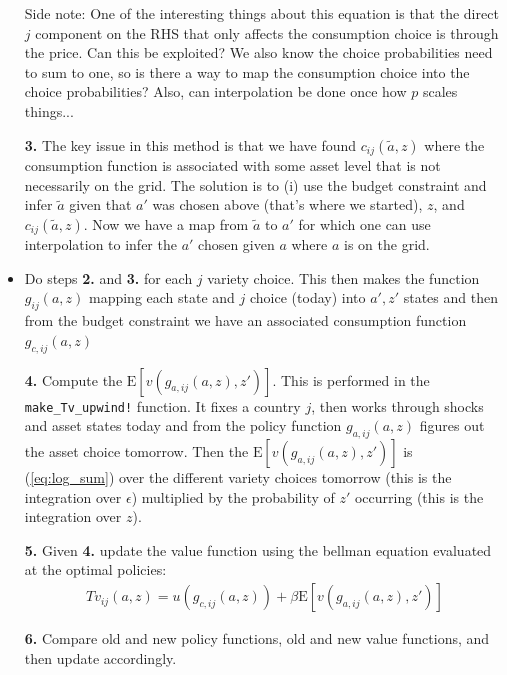 \documentclass[12pt,pdftex]{article}
\begin{document}
\begin{onehalfspacing}
\begin{itemize}
Side note: One of the interesting things about this equation is that the direct $j$ component on the RHS that only affects the consumption choice is through the price. Can this be exploited? We also know the choice probabilities need to sum to one, so is there a way to map the consumption choice into the choice probabilities? Also, can interpolation be done once how $p$ scales things...

\item[\textbf{3.}] The key issue in this method is that we have found  $c_{ij}(\tilde a, z)$ where the consumption function is associated with some asset level that is not necessarily on the grid. The solution is to (i) use the budget constraint and infer $\tilde a$ given that $a'$ was chosen above (that's where we started), $z$, and $c_{ij}(\tilde a, z)$. Now we have a map from $\tilde a$ to $a'$ for which one can use interpolation to infer the $a'$ chosen given $a$ where $a$ is on the grid.

\item Do steps \textbf{2.} and \textbf{3.} for each $j$ variety choice. This then makes the function $g_{ij}(a,z)$ mapping each state and $j$ choice (today) into $a', z'$ states and then from the budget constraint we have an associated consumption function $g_{c,ij}(a,z)$

\item[\textbf{4.}] Compute the $\mathrm{E}\left[ v(g_{a,ij}(a,z), z') \right]$. This is performed in the {\tt{make\_Tv\_upwind!}} function. It fixes a country $j$, then works through shocks and asset states today and from the policy function $g_{a,ij}(a,z)$ figures out the asset choice tomorrow. Then the $\mathrm{E}\left[ v(g_{a,ij}(a,z), z') \right]$ is (\ref{eq:log_sum}) over the different variety choices tomorrow (this is the integration over $\epsilon$) multiplied by the probability of $z'$ occurring (this is the integration over $z$).

\item[\textbf{5.}] Given \textbf{4.} update the value function using the bellman equation evaluated at the optimal policies:
\begin{align}
Tv_{ij}(a, z) = u(g_{c,ij}(a,z)) + \beta \mathrm{E}\left[ v(g_{a,ij}(a,z), z') \right]
\end{align}

\item[\textbf{6.}] Compare old and new policy functions, old and new value functions, and then update accordingly.



\end{itemize}
\end{onehalfspacing}
\end{document}
